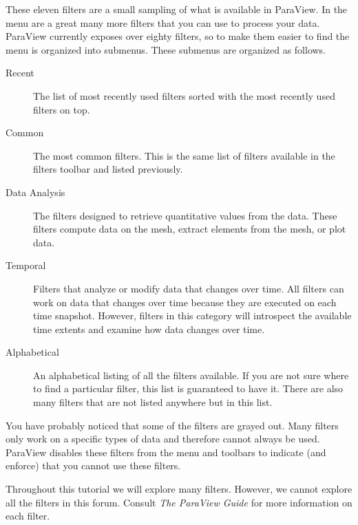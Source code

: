 
These eleven filters are a small sampling of what is available in ParaView.
In the  menu are a great many more filters that you can use to
process your data.  ParaView currently exposes over eighty filters, so to
make them easier to find the  menu is organized into submenus.
These submenus are organized as follows.

\begin{description}
\item[Recent] The list of most recently used filters sorted with the most
  recently used filters on top.
\item[Common] The most common filters.  This is the same list of filters
  available in the filters toolbar and listed previously.
\item[Data Analysis] The filters designed to retrieve quantitative values
  from the data.  These filters compute data on the mesh, extract elements
  from the mesh, or plot data.
\item[Temporal] Filters that analyze or modify data that changes over time.
  All filters can work on data that changes over time because they are
  executed on each time snapshot.  However, filters in this category will
  introspect the available time extents and examine how data changes over
  time.
\item[Alphabetical] An alphabetical listing of all the filters available.
  If you are not sure where to find a particular filter, this list is
  guaranteed to have it.  There are also many filters that are not listed
  anywhere but in this list.
\end{description}

You have probably noticed that some of the filters are grayed out.  Many
filters only work on a specific types of data and therefore cannot always
be used.  ParaView disables these filters from the menu and toolbars to
indicate (and enforce) that you cannot use these filters.

Throughout this tutorial we will explore many filters.  However, we cannot
explore all the filters in this forum.  Consult \emph{The ParaView Guide}
for more information on each filter.

